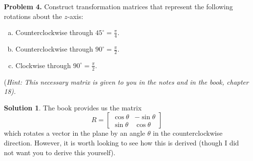 \documentclass[12pt]{report} %
\theoremstyle{definition}
\newtheorem{solution}{Solution}
\begin{document}
\noindent\textbf{Problem 4.} Construct transformation matrices that represent the following rotations about the $z$-axis:
\begin{enumerate}[(a)]
    \item Counterclockwise through $45^\circ = \frac{\pi}{4}$.
    \item Counterclockwise through $90^\circ = \frac{\pi}{2}$.
    \item Clockwise through $90^\circ = \frac{\pi}{2}$.
\end{enumerate}
(\emph{Hint: This necessary matrix is given to you in the notes and in the book, chapter 18).}

\begin{solution}
The book provides us the matrix
\[
R= \begin{bmatrix} \cos \theta & - \sin \theta \\ \sin \theta & \cos \theta \end{bmatrix}
\]
which rotates a vector in the plane by an angle $\theta$ in the counterclockwise direction.  However, it is worth looking to see how this is derived (though I did not want you to derive this yourself).


\end{solution}
\end{document}
